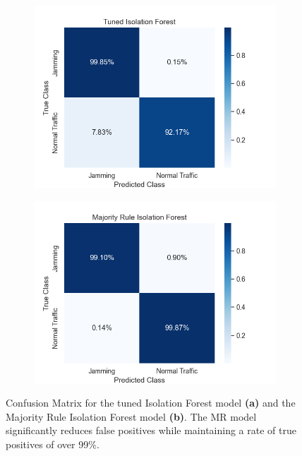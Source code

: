 \documentclass[futureinternet,article,submit,pdftex,moreauthors]{Definitions/mdpi}
\begin{document}
\begin{figure}[H]
	\centering
	\begin{subfigure}{0.49\textwidth}
		\centering
		\includegraphics[width=\textwidth]{img/ConfusionMatrixTunedIF.png}
		\caption{}
		\label{fig:ConfusionMatrixStandardTunedIF1}
	\end{subfigure}
	\hfill
	\begin{subfigure}{0.49\textwidth}
		\centering
		\includegraphics[width=\textwidth]{img/ConfusionMatrixMajorityIF.png}
		\caption{}
		\label{fig:ConfusionMatrixMajorityIF}
	\end{subfigure}
	\caption{Confusion Matrix for the tuned Isolation Forest model \textbf{(a)} and the Majority Rule Isolation Forest model \textbf{(b)}. The MR model significantly reduces false positives while maintaining a rate of true positives of over 99\%.}
	\label{fig:ConfusionMatrixTunedMajorityIF}
\end{figure}
\end{document}
